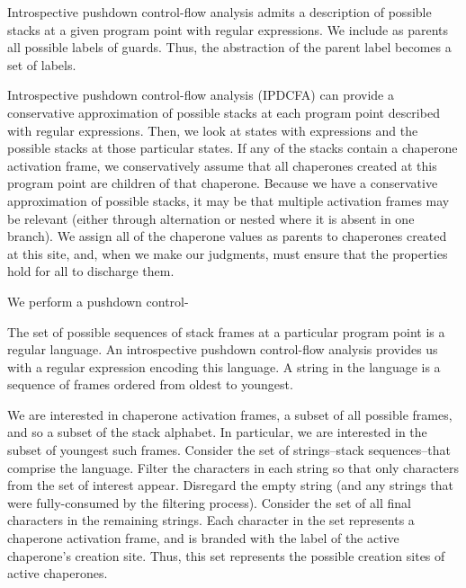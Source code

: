 \documentclass{sigplanconf}
\begin{document}
Introspective pushdown control-flow analysis admits a description of possible stacks at a given program point with regular expressions. We include as parents all possible labels of guards. Thus, the abstraction of the parent label becomes a set of labels.



Introspective pushdown control-flow analysis (IPDCFA) can provide a conservative approximation of possible stacks at each program point described with regular expressions. Then, we look at states with expressions  and the possible stacks at those particular states. If any of the stacks contain a chaperone activation frame, we conservatively assume that all chaperones created at this program point are children of that chaperone. Because we have a conservative approximation of possible stacks, it may be that multiple activation frames may be relevant (either through alternation or nested where it is absent in one branch). We assign all of the chaperone values as parents to chaperones created at this site, and, when we make our judgments, must ensure that the properties hold for all to discharge them.

We perform a pushdown control-

The set of possible sequences of stack frames at a particular program point is a regular language.
An introspective pushdown control-flow analysis provides us with a regular expression encoding this language.
A string in the language is a sequence of frames ordered from oldest to youngest.

We are interested in chaperone activation frames, a subset of all possible frames, and so a subset of the stack alphabet.
In particular, we are interested in the subset of youngest such frames.
Consider the set of strings--stack sequences--that comprise the language.
Filter the characters in each string so that only characters from the set of interest appear.
Disregard the empty string (and any strings that were fully-consumed by the filtering process).
Consider the set of all final characters in the remaining strings.
Each character in the set represents a chaperone activation frame, and is branded with the label of the active chaperone's creation site.
Thus, this set represents the possible creation sites of active chaperones.
\end{document}

